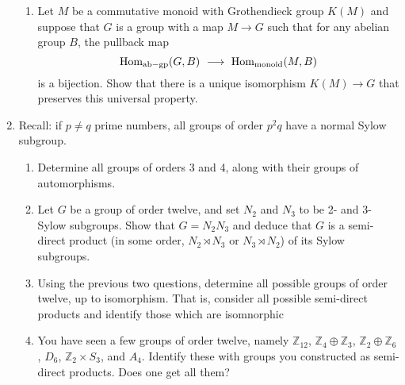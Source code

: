 \documentclass[12pt]{article}
\newcommand{\ZZ}{{\mathbb Z}}
\newcommand{\Hom}{\mbox{Hom}}
\begin{document}
\begin{enumerate}
\begin{enumerate}
        \item Let $M$ be a commutative monoid with Grothendieck group $K(M)$ and suppose that $G$ is a group with a map
            $M\to G$ such that for any abelian group $B$, the pullback map
          \[
          \Hom_{\rm ab-gp}(G,B)\ \longrightarrow\ \Hom_{\rm monoid}(M,B)
          \]
          is a bijection.
          Show that there is a unique isomorphism $K(M)\to G$ that preserves this universal property. 
      
\end{enumerate}          



%  
\item {}
Recall: if $p\neq q$ prime numbers, all groups of order $p^2q$ have a normal Sylow subgroup.



\begin{enumerate}

\item Determine all groups of orders 3 and 4, along with their groups of automorphisms.

\item Let $G$ be a group of order twelve, and set $N_2$ and $N_3$ to be 2- and 3-Sylow subgroups.
  Show that $G=N_2 N_3$ and deduce that $G$ is a semi-direct product (in some order, $N_2\rtimes N_3$ or $N_3\rtimes N_2$)
  of its Sylow subgroups.

\item  Using the previous two questions, determine all possible groups of order twelve, up to isomorphism.
  That is, consider all possible semi-direct products and identify those which are isomnorphic

\item You have seen a few groups of order twelve, namely $\ZZ_{12}$, $\ZZ_4\oplus \ZZ_3$, $\ZZ_2\oplus \ZZ_6$,
  $D_{6}$, $\ZZ_2\times S_3$, and $A_4$.
  Identify these with groups you constructed as semi-direct products.
  Does one get all them?

      
\end{enumerate}



\end{enumerate}
\end{document}
